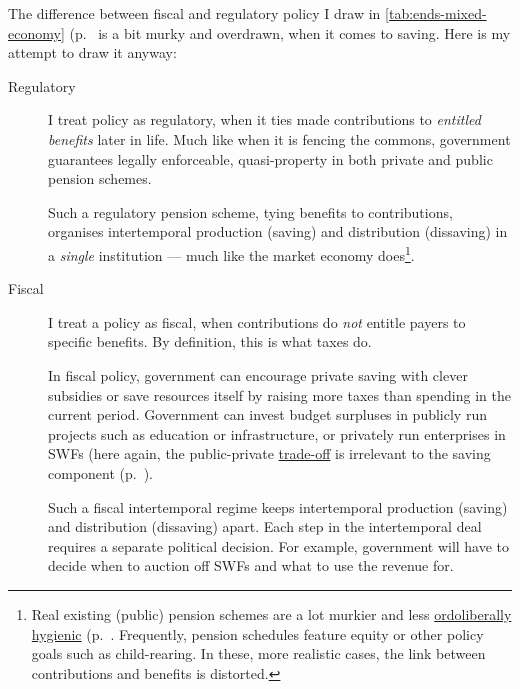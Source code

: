 The difference between fiscal and regulatory policy I draw in \autoref{tab:ends-mixed-economy} (p.~\pageref{tab:ends-mixed-economy} is a bit murky and overdrawn, when it comes to saving.  Here is my attempt to draw it anyway: 
\begin{description}
	\item[Regulatory] I treat policy as regulatory, when it ties made contributions to \emph{entitled benefits} later in life. Much like when it is fencing the commons, government guarantees legally enforceable, quasi-property in both private and public pension schemes. 
	
	Such a regulatory pension scheme, tying benefits to contributions, organises intertemporal production (saving) and distribution (dissaving) in a \emph{single} institution --- much like the market economy does\footnote{
		Real existing (public) pension schemes are a lot murkier and less \hyperref[sec:ordoliberal-hygiene]{ordoliberally hygienic} (p.~\pageref{sec:ordoliberal-hygiene}. Frequently, pension schedules feature equity or other policy goals such as child-rearing. In these, more realistic cases, the link between contributions and benefits is distorted.}.
	\item[Fiscal] I treat a policy as fiscal, when contributions do \emph{not} entitle payers to specific benefits. By definition, this is what taxes do.
	
	In fiscal policy, government can encourage private saving with clever subsidies or save resources itself by raising more taxes than spending in the current period. Government can invest budget surpluses in publicly run projects such as education or infrastructure, or privately run enterprises in \glspl{SWF} (here again, the public-private \hyperref[sec:trade-offs]{trade-off} is irrelevant to the saving component (p.~\pageref{trade-offs}).
	
	Such a fiscal intertemporal regime keeps intertemporal production (saving) and distribution (dissaving) apart. Each step in the intertemporal deal requires a separate political decision. For example, government will have to decide when to auction off \glspl{SWF} and what to use the revenue for.
\end{description}

